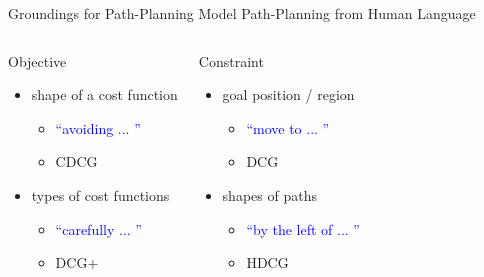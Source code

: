 \begin{frame}{Groundings for Path-Planning}{ Model Path-Planning from Human Language } 


\begin{columns}
\begin{block}{Objective}
\begin{itemize}
\item shape of a cost function
\begin{itemize}
\item \textcolor{blue}{``avoiding ... ''}
\item CDCG
\end{itemize}
\item types of cost functions
\begin{itemize}
\item \textcolor{blue}{``carefully ... ''}
\item DCG+
\end{itemize}
\end{itemize}
\end{block}

\begin{block}{Constraint}
\begin{itemize}
\item goal position / region
\begin{itemize}
\item \textcolor{blue}{``move to ... ''}
\item DCG
\end{itemize}
\item shapes of paths
\begin{itemize}
\item \textcolor{blue}{``by the left of ... ''}
\item HDCG
\end{itemize}
\end{itemize}
\end{block}

\end{columns}

\end{frame}

